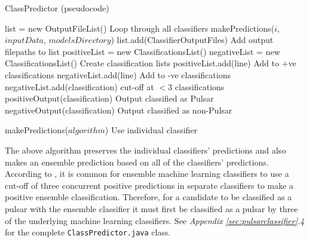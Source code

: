 \documentclass{article}
\begin{document}
\begin{algorithm}[H]
    \caption{ClassPredictor (pseudocode)}
    \begin{algorithmic}[1]
            \State list = new OutputFileList()
                \Comment Loop through all classifiers
                \State makePredictions($i$, $inputData$, $modelsDirectory$)
                \State list.add(ClassifierOutputFiles)
                \Comment Add output filepaths to list
            \EndFor
            \State positiveList = new ClassificationsList()
            \State negativeList = new ClassificationsList()
            \Comment Create classification lists
                        \State positiveList.add(line)
                        \Comment Add to +ve classifications
                    \EndFor
                        \State negativeList.add(line)
                        \Comment Add to -ve classifications
                    \EndFor
                \EndIf
            \EndFor
                    \State negativeList.add(classification)
                    \Comment cut-off at $< 3$ classifications
                \Else
                    \State positiveOutput(classification)
                    \Comment Output classified as Pulsar
                \EndIf
            \EndFor
                \State negativeOutput(classification)
                \Comment Output classified as non-Pulsar
            \EndFor

        \Else 
            \State makePredictions($algorithm$)
            \Comment Use individual classifier
        \EndIf
        
    \end{algorithmic}
\end{algorithm}

The above algorithm preserves the individual classifiers' predictions and also makes an ensemble prediction based on all of the classifiers' predictions. According to \cite{tan}, it is common for ensemble machine learning classifiers to use a cut-off of three concurrent positive predictions in separate classifiers to make a positive ensemble classification. Therefore, for a candidate to be classified as a pulsar with the ensemble classifier it must first be classified as a pulsar by three of the underlying machine learning classifiers. See \emph{Appendix \ref{sec:pulsarclassifier}.4} for the complete \verb|ClassPredictor.java| class.
\end{document}
